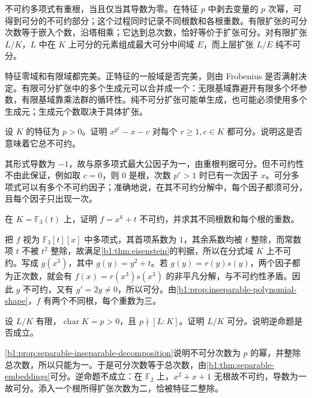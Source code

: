 




\begin{chaptersummary}
	不可约多项式有重根，当且仅当其导数为零。在特征 \(p\) 中剥去变量的 \(p\) 次幂，可得到可分的不可约部分；这个过程同时记录不同根数和各根重数。有限扩张的可分次数等于嵌入个数，沿塔相乘；它达到总次数，恰好等价于扩张可分。对有限扩张 \(L/K\)，\(L\) 中在 \(K\) 上可分的元素组成最大可分中间域 \(E\)，而上层扩张 \(L/E\) 纯不可分。

	\ProseParagraphBreak
	特征零域和有限域都完美。正特征的一般域是否完美，则由 Frobenius 是否满射决定。有限可分扩张中的多个生成元可以合并成一个：无限基域靠避开有限多个坏参数，有限基域靠乘法群的循环性。纯不可分扩张可能单生成，也可能必须使用多个生成元；生成元个数取决于具体扩张。
\end{chaptersummary}

\BookExercises

\begin{exercise}\label{b1:ex:16-1}
	设 \(K\) 的特征为 \(p>0\)。证明 \(x^{p^r}-x-c\) 对每个 \(r\geq1,c\in K\) 都可分。说明这是否意味着它总不可约。
\end{exercise}
\begin{solution}
	其形式导数为 \(-1\)，故与原多项式最大公因子为一，由重根判据可分。但不可约性不由此保证，例如取 \(c=0\)，则 \(0\) 是根，次数 \(p^r>1\) 时已有一次因子 \(x\)。可分多项式可以有多个不可约因子；准确地说，在其不可约分解中，每个因子都须可分，且每个因子只出现一次。
\end{solution}

\begin{exercise}\label{b1:ex:16-2}
	在 \(K=\mathbb F_3(t)\) 上，证明 \(f=x^6+t\) 不可约，并求其不同根数和每个根的重数。
\end{exercise}
\begin{solution}
	把 \(f\) 视为 \(\mathbb F_3[t][x]\) 中多项式，其首项系数为 \(1\)，其余系数均被 \(t\) 整除，而常数项 \(t\) 不被 \(t^2\) 整除，故满足\cref{b1:thm:eisenstein}的判据，所以在分式域 \(K\) 上不可约。写成 \(g(x^3)\)，其中 \(g(y)=y^2+t\)。若 \(g(y)=r(y)s(y)\)，两个因子都为正次数，就会有 \(f(x)=r(x^3)s(x^3)\) 的非平凡分解，与不可约性矛盾。因此 \(g\) 不可约，又有 \(g'=2y\neq0\)，所以可分。由\cref{b1:prop:inseparable-polynomial-shape}，\(f\) 有两个不同根，每个重数为三。
\end{solution}

\begin{exercise}\label{b1:ex:16-3}
	设 \(L/K\) 有限，\(\operatorname{char}K=p>0\)，且 \(p\nmid[L:K]\)。证明 \(L/K\) 可分。说明逆命题是否成立。
\end{exercise}
\begin{solution}
	\cref{b1:prop:separable-inseparable-decomposition}说明不可分次数为 \(p\) 的幂，并整除总次数，所以只能为一。于是可分次数等于总次数，由\cref{b1:thm:separable-embeddings}可分。逆命题不成立：在 \(\mathbb F_2\) 上，\(x^2+x+1\) 无根故不可约，导数为一故可分。添入一个根所得扩张次数为二，恰被特征二整除。
\end{solution}

